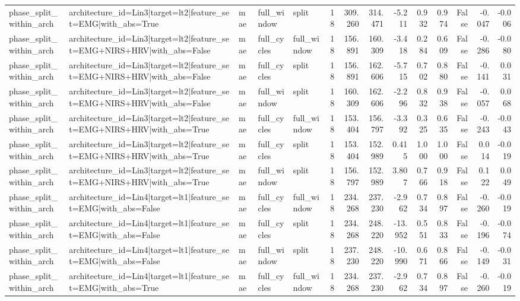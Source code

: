 \begin{table}
\begin{tabular}{lllllrrrrrrrrr}
phase_split_within_arch & architecture_id=Lin3|target=lt2|feature_set=EMG|with_abs=True & mae & full_window & split & 18 & 309.260 & 314.471 & -5.211 & 0.932 & 0.974 & False & -0.047 & -0.006 \\
phase_split_within_arch & architecture_id=Lin3|target=lt2|feature_set=EMG+NIRS+HRV|with_abs=False & mae & full_cycles & full_window & 18 & 156.891 & 160.309 & -3.418 & 0.284 & 0.609 & False & -0.286 & -0.080 \\
phase_split_within_arch & architecture_id=Lin3|target=lt2|feature_set=EMG+NIRS+HRV|with_abs=False & mae & full_cycles & split & 18 & 156.891 & 162.606 & -5.715 & 0.702 & 0.880 & False & -0.141 & 0.031 \\
phase_split_within_arch & architecture_id=Lin3|target=lt2|feature_set=EMG+NIRS+HRV|with_abs=False & mae & full_window & split & 18 & 160.309 & 162.606 & -2.296 & 0.832 & 0.938 & False & -0.057 & 0.068 \\
phase_split_within_arch & architecture_id=Lin3|target=lt2|feature_set=EMG+NIRS+HRV|with_abs=True & mae & full_cycles & full_window & 18 & 153.404 & 156.797 & -3.392 & 0.325 & 0.635 & False & -0.243 & -0.043 \\
phase_split_within_arch & architecture_id=Lin3|target=lt2|feature_set=EMG+NIRS+HRV|with_abs=True & mae & full_cycles & split & 18 & 153.404 & 152.989 & 0.415 & 1.000 & 1.000 & False & 0.014 & -0.019 \\
phase_split_within_arch & architecture_id=Lin3|target=lt2|feature_set=EMG+NIRS+HRV|with_abs=True & mae & full_window & split & 18 & 156.797 & 152.989 & 3.807 & 0.766 & 0.918 & False & 0.122 & 0.049 \\
phase_split_within_arch & architecture_id=Lin4|target=lt1|feature_set=EMG|with_abs=False & mae & full_cycles & full_window & 18 & 234.268 & 237.230 & -2.962 & 0.734 & 0.897 & False & -0.260 & -0.019 \\
phase_split_within_arch & architecture_id=Lin4|target=lt1|feature_set=EMG|with_abs=False & mae & full_cycles & split & 18 & 234.268 & 248.220 & -13.952 & 0.551 & 0.833 & False & -0.196 & -0.074 \\
phase_split_within_arch & architecture_id=Lin4|target=lt1|feature_set=EMG|with_abs=False & mae & full_window & split & 18 & 237.230 & 248.220 & -10.990 & 0.671 & 0.866 & False & -0.149 & -0.031 \\
phase_split_within_arch & architecture_id=Lin4|target=lt1|feature_set=EMG|with_abs=True & mae & full_cycles & full_window & 18 & 234.268 & 237.230 & -2.962 & 0.734 & 0.897 & False & -0.260 & -0.019 \\

\end{tabular}
\end{table}
